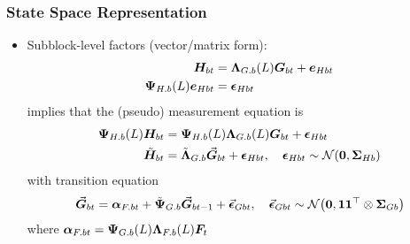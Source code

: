 \documentclass[10pt, compress, notheorems, aspectratio=169]{beamer}
\let\originalleft\left
\let\originalright\right
\renewcommand{\left}{\mathopen{}\mathclose \bgroup \originalleft}
\renewcommand{\right}{\aftergroup \egroup \originalright}
\begin{document}
\begin{frame}
	\frametitle{State Space Representation}
	\begin{itemize}
		\item Subblock-level factors (vector/matrix form):
			\begin{align*}
				{\bm H}_{bt} &= {\bm \Lambda}_{G.b} \left( L \right) {\bm G}_{bt} + {\bm e}_{Hbt} \\
				{\bm \Psi}_{H.b} (L) {\bm e}_{Hbt} &= {\bm \epsilon}_{Hbt}
			\end{align*}
			implies that the (pseudo) measurement equation is
			\begin{equation}
				\begin{aligned}
					{\bm \Psi}_{H.b} (L) {\bm H}_{bt} &= {\bm \Psi}_{H.b} (L) {\bm \Lambda}_{G.b} \left( L \right) {\bm G}_{bt} + {\bm \epsilon}_{Hbt} \\
					\tilde{\bm H}_{bt} &= \tilde{\bm \Lambda}_{G.b} \vec{\bm G}_{bt} + {\bm \epsilon}_{Hbt}, \quad {\bm \epsilon}_{Hbt} \sim \mathcal{N} \left( {\bf 0}, {\bm \Sigma}_{Hb} \right)
				\end{aligned}
			\end{equation}
			with transition equation
			\begin{equation}
				\vec{\bm G}_{bt} = {\bm \alpha}_{F.bt} + \tilde{\bm \Psi}_{G.b} \vec{\bm G}_{bt-1} + \vec{\bm \epsilon}_{Gbt}, \quad \vec{\bm \epsilon}_{Gbt} \sim \mathcal{N} \left( {\bf 0}, {\bf 1} {\bf 1}^{\top} \otimes {\bm \Sigma}_{Gb} \right)
			\end{equation}
			where ${\bm \alpha}_{F.bt} = {\bm \Psi}_{G.b} \left( L \right) {\bm \Lambda}_{F.b} \left( L \right) {\bm F}_{t}$
	\end{itemize}
\end{frame}
\end{document}
